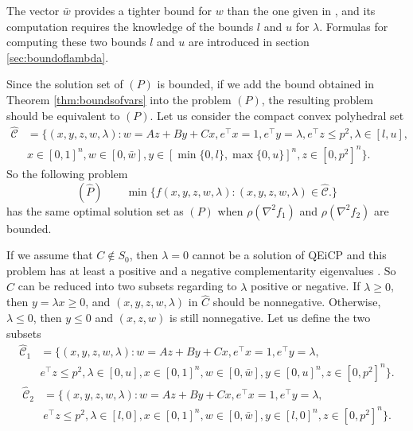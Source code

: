 \documentclass[3p]{elsarticle}
\begin{document}
\begin{rmk}
	The vector $\bar{w}$ provides a tighter bound for $w$ than the one given in \cite{Niu15}, and its computation requires the knowledge of the bounds $l$ and $u$ for $\lambda$. Formulas for computing these two bounds $l$ and $u$ are introduced in section \ref{sec:boundoflambda}.
\end{rmk}

Since the solution set of $(P)$ is bounded, if we add the bound obtained in Theorem \ref{thm:boundsofvars} into the problem $(P)$, the resulting problem should be equivalent to $(P)$. Let us consider the compact convex polyhedral set 
\begin{align}\label{eq:Chat}
\hat{\mathcal{C}} &= \{(x,y,z,w,\lambda): w=Az+By+Cx, e^{\top}x=1, e^{\top}y=\lambda, e^{\top}z\leq p^2,\lambda \in [l,u], \\
\nonumber & x\in[0,1]^n, w\in [0,\bar{w}], y\in [\min\{0,l\},\max\{0,u\}]^n, z\in [0,p^2]^n\}. 
\end{align}
So the following problem 
\begin{equation}\label{prob:nlphat}
(\hat{P}) \qquad 
\min \{f(x,y,z,w,\lambda) : (x,y,z,w,\lambda) \in \mathcal{\hat{C}}.\}\nonumber
\end{equation}
has the same optimal solution set as $(P)$ when $\rho (\nabla^2 f_1)$ and $\rho (\nabla^2 f_2)$ are bounded.

If we assume that $C\notin S_0$, then $\lambda=0$ cannot be a solution of QEiCP and this problem has at least a positive and a negative complementarity eigenvalues \cite{Iusem16}. So $\hat{C}$ can be reduced into two subsets regarding to $\lambda$ positive or negative. If $\lambda\geq 0$, then $y=\lambda x\geq 0$, and $(x,y,z,w,\lambda)$ in $\hat{C}$ should be nonnegative. Otherwise, $\lambda\leq 0$, then $y\leq 0$ and $(x,z,w)$ is still nonnegative. Let us define the two subsets
\begin{align}\label{eq:Chat1}
\hat{\mathcal{C}}_1 &= \{(x,y,z,w,\lambda): w=Az+By+Cx, e^{\top}x=1, e^{\top}y=\lambda, \\\nonumber 
& e^{\top}z\leq p^2,\lambda \in [0,u], x\in[0,1]^n, w\in [0,\bar{w}], y\in [0,u]^n, z\in [0,p^2]^n\}. 
\end{align}
\begin{align}\label{eq:Chat2}
\hat{\mathcal{C}}_2 &= \{(x,y,z,w,\lambda): w=Az+By+Cx, e^{\top}x=1, e^{\top}y=\lambda, \\
\nonumber &  e^{\top}z\leq p^2,\lambda \in [l,0], x\in[0,1]^n, w\in [0,\bar{w}], y\in [l,0]^n, z\in [0,p^2]^n\}. 
\end{align}
\end{document}

